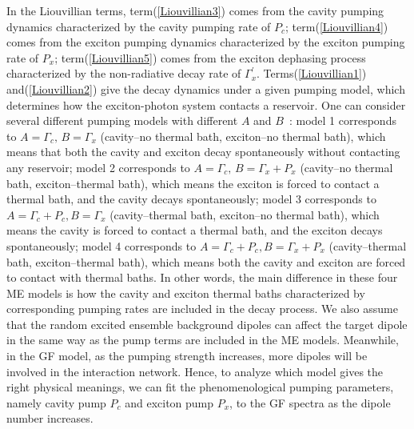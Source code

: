 In the Liouvillian terms, term(\ref{Liouvillian3}) comes from the cavity pumping dynamics characterized by the cavity pumping rate of $P_c$; term(\ref{Liouvillian4}) comes from the exciton pumping dynamics characterized by the exciton pumping rate of $P_x$; term(\ref{Liouvillian5}) comes from the exciton dephasing process characterized by the non-radiative decay rate of $\Gamma_x^{\prime}$. Terms(\ref{Liouvillian1}) and(\ref{Liouvillian2}) give the decay dynamics under a given pumping model, which determines how the exciton-photon system contacts a reservoir.
One can consider several different pumping models with different $A$ and $B$~\cite{yao2010nonlinear}: model 1 corresponds to $A=\Gamma_c,\, B=\Gamma_x$ (cavity--no thermal bath, exciton--no thermal bath), which means that both the cavity and exciton decay spontaneously without contacting any reservoir; model 2 corresponds to $A=\Gamma_c,\, B=\Gamma_x+P_x$ (cavity--no thermal bath, exciton--thermal bath), which means the exciton is forced to contact a thermal bath, and the cavity decays spontaneously; model 3 corresponds to $A=\Gamma_c+P_c, B=\Gamma_x$ (cavity--thermal bath, exciton--no thermal bath), which means the cavity is forced to contact a thermal bath, and the exciton decays spontaneously; model 4 corresponds to $A=\Gamma_c+P_c, B=\Gamma_x+P_x$ (cavity--thermal bath, exciton--thermal bath), which means both the cavity and exciton are forced to contact with thermal baths. In other words, the main difference in these four ME models is how the cavity and exciton thermal baths characterized by corresponding pumping rates are included in the decay process. We also assume that the random excited ensemble background dipoles can affect the target dipole in the same way as the pump terms are included in the ME models. Meanwhile, in the GF model, as the pumping strength increases, more dipoles will be involved in the interaction network. Hence, to analyze which model gives the right physical meanings, we can fit the phenomenological pumping parameters, namely cavity pump $P_c$ and exciton pump $P_x$, to the GF spectra as the dipole number increases.

